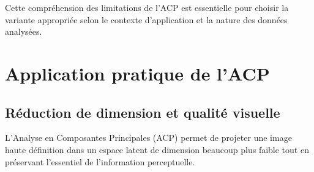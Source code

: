 \documentclass[a4paper,12pt]{report}
\begin{document}
Cette compréhension des limitations de l'ACP est essentielle pour choisir la variante appropriée selon le contexte d'application et la nature des données analysées.

\newpage

\chapter{Application pratique de l'ACP}
\label{chap:acp_compression}

\section{Réduction de dimension et qualité visuelle}
\label{sec:acp_images}

L’Analyse en Composantes Principales (ACP) permet de projeter une image haute
définition dans un espace latent de dimension beaucoup plus faible tout en
préservant l’essentiel de l’information perceptuelle.
\end{document}
